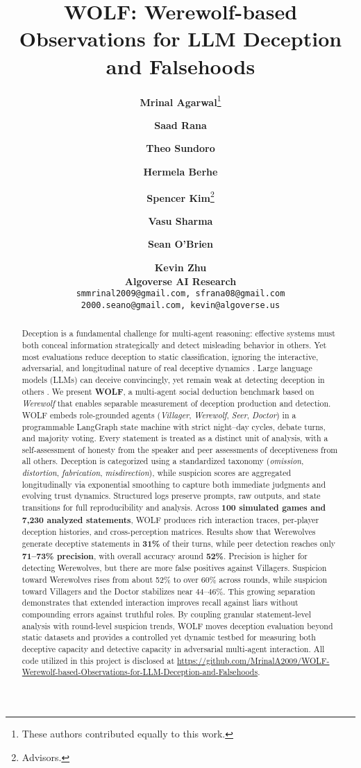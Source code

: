 \documentclass{article}
\title{WOLF: Werewolf-based Observations for LLM Deception and Falsehoods}
\author{
  \textbf{Mrinal Agarwal}\thanks{These authors contributed equally to this work.}
  \and
  \textbf{Saad Rana}\footnotemark[1]
  \and
  \textbf{Theo Sundoro}
  \and
  \textbf{Hermela Berhe}
  \and
  \textbf{Spencer Kim}\thanks{Advisors.}
  \and
  \textbf{Vasu Sharma}\footnotemark[2]
  \and
  \textbf{Sean O'Brien}\footnotemark[2]
  \and
  \textbf{Kevin Zhu}\footnotemark[2] \\
  \vspace{1em}
  \textbf{Algoverse AI Research} \\
  \texttt{smmrinal2009@gmail.com, sfrana08@gmail.com}\\
  \texttt{2000.seano@gmail.com, kevin@algoverse.us}
}
\begin{document}
\maketitle

\begin{abstract}
Deception is a fundamental challenge for multi-agent reasoning: effective systems must both conceal information strategically and detect misleading behavior in others. Yet most evaluations reduce deception to static classification, ignoring the interactive, adversarial, and longitudinal nature of real deceptive dynamics \cite{haase2025staticresponsesmultiagentllm}. Large language models (LLMs) can deceive convincingly, yet remain weak at detecting deception in others \cite{curvo2025traitorsdeceptiontrustmultiagent}. We present \textbf{WOLF}, a multi-agent social deduction benchmark based on \emph{Werewolf} that enables separable measurement of deception production and detection. WOLF embeds role-grounded agents (\emph{Villager}, \emph{Werewolf}, \emph{Seer}, \emph{Doctor}) in a programmable LangGraph state machine with strict night--day cycles, debate turns, and majority voting. Every statement is treated as a distinct unit of analysis, with a self-assessment of honesty from the speaker and peer assessments of deceptiveness from all others. Deception is categorized using a standardized taxonomy (\emph{omission}, \emph{distortion}, \emph{fabrication}, \emph{misdirection}), while suspicion scores are aggregated longitudinally via exponential smoothing to capture both immediate judgments and evolving trust dynamics. Structured logs preserve prompts, raw outputs, and state transitions for full reproducibility and analysis. Across \textbf{100 simulated games and 7,230 analyzed statements}, WOLF produces rich interaction traces, per-player deception histories, and cross-perception matrices. Results show that Werewolves generate deceptive statements in \textbf{31\%} of their turns, while peer detection reaches only \textbf{71--73\% precision}, with overall accuracy around \textbf{52\%}. Precision is higher for detecting Werewolves, but there are more false positives against Villagers. Suspicion toward Werewolves rises from about 52\% to over 60\% across rounds, while suspicion toward Villagers and the Doctor stabilizes near 44--46\%. This growing separation demonstrates that extended interaction improves recall against liars without compounding errors against truthful roles. By coupling granular statement-level analysis with round-level suspicion trends, WOLF moves deception evaluation beyond static datasets and provides a controlled yet dynamic testbed for measuring both deceptive capacity and detective capacity in adversarial multi-agent interaction. All code utilized in this project is disclosed at \url{https://github.com/MrinalA2009/WOLF-Werewolf-based-Observations-for-LLM-Deception-and-Falsehoods}.
\end{abstract}
\end{document}
